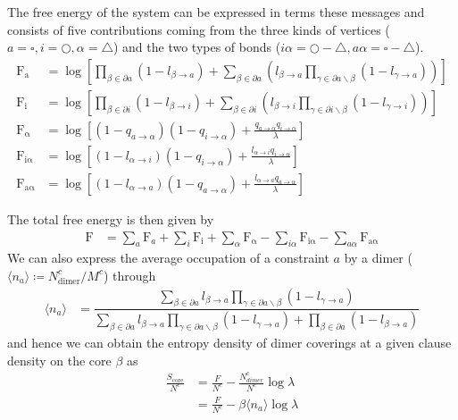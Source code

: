 \documentclass[aps,pra,twocolumn,superscriptaddress,amsmath]{revtex4-1}
\newcommand{\Sc}{S_{\mathrm{core}}}
\begin{document}
\begin{widetext}
The free energy
of the system can be expressed in terms these messages and consists
of five contributions coming from the three kinds of vertices ($a=\square,i=\bigcirc,\alpha=\triangle$)
and the two types of bonds ($i\alpha=\bigcirc-\triangle,a\alpha=\square-\triangle$).
\begin{align}
\mathrm{F_{a}} & =\log\left[\prod_{\beta\in\partial a}\left(1-l_{\beta\rightarrow a}\right)+\sum_{\beta\in\partial a}\left(l_{\beta\rightarrow a}\prod_{\gamma\in\partial a\backslash\beta}\left(1-l_{\gamma\rightarrow a}\right)\right)\right]\\
\mathrm{F_{i}} & =\log\left[\prod_{\beta\in\partial i}\left(1-l_{\beta\rightarrow i}\right)+\sum_{\beta\in\partial i}\left(l_{\beta\rightarrow i}\prod_{\gamma\in\partial i\backslash\beta}\left(1-l_{\gamma\rightarrow i}\right)\right)\right]\\
\mathrm{F_{\alpha}} & =\log\left[\left(1-q_{a\rightarrow\alpha}\right)\left(1-q_{i\rightarrow\alpha}\right)+\frac{q_{a\rightarrow\alpha}q_{i\rightarrow\alpha}}{\lambda}\right]\\
\mathrm{F_{i\alpha}} & =\log\left[\left(1-l_{\alpha\rightarrow i}\right)\left(1-q_{i\rightarrow\alpha}\right)+\frac{l_{\alpha\rightarrow i}q_{i\rightarrow\alpha}}{\lambda}\right]\\
\mathrm{F_{a\alpha}} & =\log\left[\left(1-l_{\alpha\rightarrow a}\right)\left(1-q_{a\rightarrow\alpha}\right)+\frac{l_{\alpha\rightarrow a}q_{a\rightarrow\alpha}}{\lambda}\right]
\end{align}

The total free energy is then given by 
\begin{align}
\mathrm{F} & =\sum_{a}\mathrm{F}_{a}+\sum_{i}\mathrm{F_{i}}+\sum_{\alpha}\mathrm{F_{\alpha}}-\sum_{i\alpha}\mathrm{F_{i\alpha}}-\sum_{a\alpha}\mathrm{F_{a\alpha}}
\end{align}
We can also express the average occupation of a constraint $a$ by
a dimer ($\langle n_{a}\rangle\coloneqq N_{\mathrm{dimer}}^{c}/M^{c}$)
through 
\begin{align}
\langle n_{a}\rangle & =\dfrac{{\displaystyle \sum_{\beta\in\partial a}}l_{\beta\rightarrow a}{\displaystyle \prod_{\gamma\in\partial a\backslash\beta}}\left(1-l_{\gamma\rightarrow a}\right)}{{\displaystyle \sum_{\beta\in\partial a}}l_{\beta\rightarrow a}{\displaystyle \prod_{\gamma\in\partial a\backslash\beta}}\left(1-l_{\gamma\rightarrow a}\right)+{\displaystyle \prod_{\beta\in\partial a}}\left(1-l_{\beta\rightarrow a}\right)}
\end{align}
%
and hence we can obtain the entropy density of dimer coverings at
a given clause density on the core $\beta$ as
%
\begin{align}
\frac{\Sc}{N^{c}} & =\frac{F}{N^{c}}-\frac{N_{dimer}^{c}}{N^{c}}\log\lambda \nonumber\\
 & =\frac{F}{N^{c}}-\beta\langle n_{a}\rangle\log\lambda
\end{align}




\end{widetext}
\end{document}
